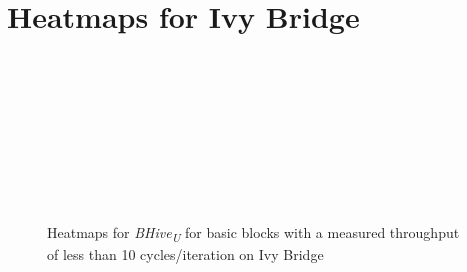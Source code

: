 \documentclass[sigconf,nonacm]{acmart}
\newcommand{\bhiveu}{\emph{BHive\textsubscript{U}}\xspace}
\begin{document}
\section{Heatmaps for Ivy Bridge}
\vfill
\begin{figure}[H]
\centering
\begin{subfigure}[t]{0.33\textwidth}\end{subfigure}~
\begin{subfigure}[t]{0.33\textwidth}\end{subfigure}~
\begin{subfigure}[t]{0.33\textwidth}\end{subfigure}\par\bigskip

\begin{subfigure}[t]{0.33\textwidth}\end{subfigure}~
\begin{subfigure}[t]{0.33\textwidth}\end{subfigure}~
\begin{subfigure}[t]{0.33\textwidth}\end{subfigure}\par\bigskip

\begin{subfigure}[t]{0.33\textwidth}\end{subfigure}
~\begin{subfigure}[t]{0.33\textwidth}\end{subfigure}
\caption{Heatmaps for \bhiveu for basic blocks with a measured throughput of less than 10 cycles/iteration on Ivy Bridge}
\end{figure}
\vfill
\end{document}
